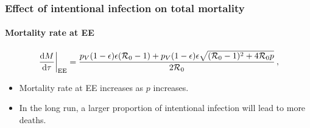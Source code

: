 \documentclass[12pt]{beamer}
\newcommand\dbyd[2]{\frac{\mathrm d{#1}}{\mathrm d{#2}}}
\newcommand{\R}{\mathcal{R}}
\newcommand{\pmV}{p_{V}}
\begin{document}
\begin{frame}
\frametitle{Effect of intentional infection on total mortality}
\framesubtitle{Mortality rate at EE}
\begin{equation}
\left. \dbyd{M}{\tau}\right|_{\rm EE}=\frac{\pmV(1-\epsilon)\epsilon(\R_0 -1)+ \pmV(1-\epsilon)\epsilon \sqrt{(\R_0-1)^2+4\R_0 p}}{2\R_0}\,,
\end{equation}
\pause
\begin{itemize}
\item Mortality rate at EE increases as $p$ increases.
\pause
\item In the long run, a larger proportion of intentional infection will lead to more deaths.
\end{itemize}
\end{frame}
\end{document}
